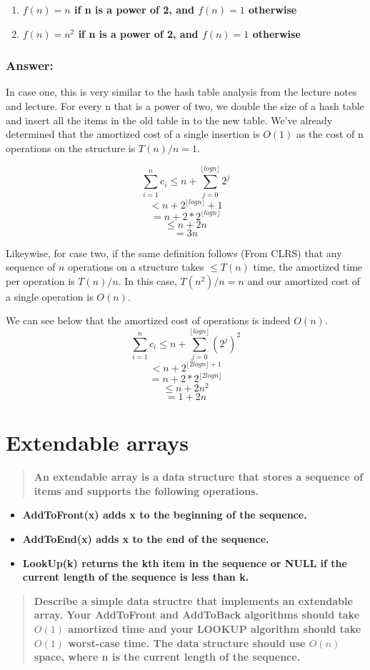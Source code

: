 \documentclass[titlepage]{article}\usepackage[]{graphicx}\usepackage[]{color}
\begin{document}
\begin{enumerate}
  \item \textbf{ $f(n) = n$ if n is a power of 2, and $f(n) = 1$ otherwise}
  \item \textbf{ $f(n) = n^2$ if n is a power of 2, and $f(n) = 1$ otherwise}
\end{enumerate}

\subsubsection{Answer: }
In case one, this is very similar to the hash table analysis from the lecture
notes and lecture. For every n that is a power of two, we double the size of a
hash table and insert all the items in the old table in to the new table. We've
already determined that the amortized cost of a single insertion is $O(1)$ as
the cost of n operations on the structure is $T(n)/n = 1$. 

\[ \sum_{i=1}^n c_i \leq n + \sum_{j=0}^{\lfloor log n \rfloor} 2^j \]
\[ < n + 2^{\lfloor log n \rfloor} +1 \]
\[ = n + 2 * 2^{\lfloor log n \rfloor} \] 
\[\leq n + 2n \]
\[ = 3n \]

Likeywise, for case two, if the same definition follows (From CLRS) that any
sequence of $n$ operations on a structure takes $\leq T(n)$ time, the amortized
time per operation is $T(n)/n$. In this case, $T(n^2)/n = n$ and our amortized
cost of a single operation is $O(n)$. 

We can see below that the amortized cost of operations is indeed $O(n)$.
\[ \sum_{i=1}^n c_i \leq n + \sum_{j=0}^{\lfloor log n \rfloor} (2^j)^2 \]
\[ < n + 2^{ \lfloor 2log n \rfloor +1 }\]
\[ = n + 2 * 2^{\lfloor 2 log n \rfloor} \] 
\[\leq n + 2n^2 \]
\[ = 1 + 2n \]


\section{Extendable arrays}
\begin{quote}
  \textbf{An extendable array is a data structure that stores a sequence of
  items and supports the following operations.}
\end{quote}

\begin{itemize}
  \item \textbf{AddToFront(x) adds x to the beginning of the sequence.}
  \item \textbf{AddToEnd(x) adds x to the end of the sequence.}
  \item \textbf{LookUp(k) returns the kth item in the sequence or NULL if the
	current length of the sequence is less than k. }
\end{itemize}
\begin{quote}
  \textbf{Describe a simple data structre that implements an extendable array.
	Your AddToFront and AddToBack algorithms should take $O(1)$ amortized time
	and your LOOKUP algorithm should take $O(1)$ worst-case time. The data
	structure should use $O(n)$ space, where n is the current length of the
  sequence.}
\end{quote}
\end{document}
